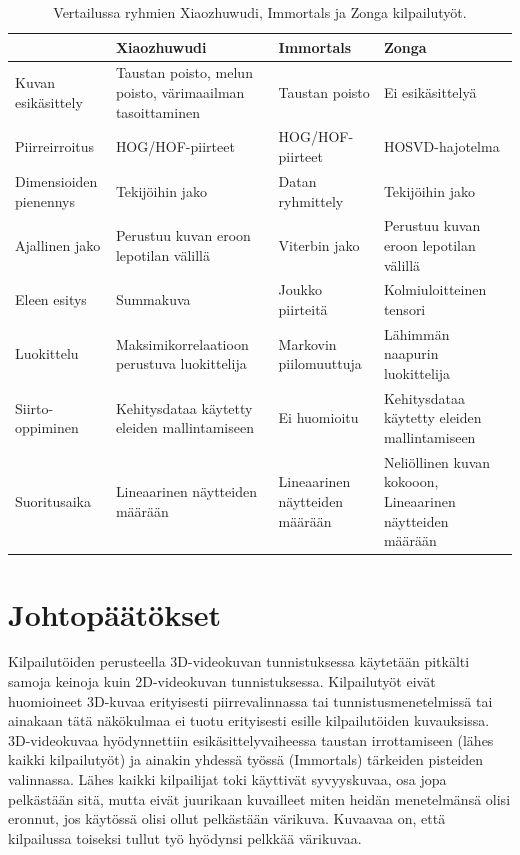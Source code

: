 \begin{table}[th]
\caption{Vertailussa ryhmien Xiaozhuwudi, Immortals ja Zonga kilpailutyöt. \citep{firstround}}
\label{table:kolmetyötä}
\begin{center}
\begin{tabular}{|p{}|p{}|p{}|p{}|} 
    \hline
 & Xiaozhuwudi & Immortals & Zonga\\
    \hline
    \hline
 Kuvan esikäsittely & Taustan poisto, melun poisto, värimaailman tasoittaminen& Taustan poisto & Ei esikäsittelyä\\
    \hline
 Piirreirroitus & HOG/HOF-piirteet & HOG/HOF-piirteet & HOSVD-hajotelma \\
    \hline
 Dimensioiden pienennys & Tekijöihin jako& Datan ryhmittely & Tekijöihin jako\\
    \hline	
 Ajallinen jako &Perustuu kuvan eroon lepotilan välillä &Viterbin jako &Perustuu kuvan eroon lepotilan välillä\\
     \hline
 Eleen esitys &Summakuva &Joukko piirteitä &Kolmiuloitteinen tensori\\
     \hline
 Luokittelu &Maksimikorrelaatioon perustuva luokittelija &Markovin piilomuuttuja &Lähimmän naapurin luokittelija\\
      \hline
 Siirto-oppiminen &Kehitysdataa käytetty eleiden mallintamiseen&Ei huomioitu&Kehitysdataa käytetty eleiden mallintamiseen\\
      \hline
 Suoritusaika &Lineaarinen näytteiden määrään&Lineaarinen näytteiden määrään &Neliöllinen kuvan kokooon, Lineaarinen näytteiden määrään\\
      \hline
	  \hline
\end{tabular}
\end{center}
\end{table}

\section {Johtopäätökset}

Kilpailutöiden perusteella 3D-videokuvan tunnistuksessa käytetään pitkälti samoja keinoja kuin 2D-videokuvan tunnistuksessa.
Kilpailutyöt eivät huomioineet 3D-kuvaa erityisesti piirrevalinnassa tai tunnistusmenetelmissä tai ainakaan tätä näkökulmaa ei tuotu erityisesti
esille kilpailutöiden kuvauksissa. 3D-videokuvaa hyödynnettiin esikäsittelyvaiheessa taustan irrottamiseen 
(lähes kaikki kilpailutyöt) ja ainakin yhdessä työssä (Immortals) tärkeiden pisteiden valinnassa. 
Lähes kaikki kilpailijat toki käyttivät syvyyskuvaa, osa jopa pelkästään sitä, mutta eivät juurikaan
kuvailleet miten heidän menetelmänsä olisi eronnut, jos käytössä olisi ollut pelkästään värikuva.
Kuvaavaa on, että kilpailussa toiseksi tullut työ hyödynsi pelkkää värikuvaa.\\

